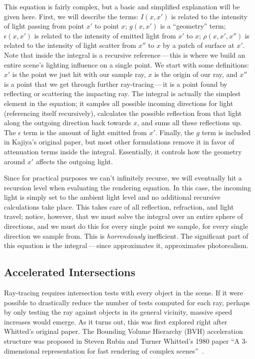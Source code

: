 This equation is fairly complex, but a basic and simplified explanation will be given here.
First, we will describe the terms: $I(x, x')$ is related to the intensity of light passing from point $x'$ to point $x$; $g(x, x')$ is a ``geometry'' term; $\epsilon(x, x')$ is related to the intensity of emitted light from $x'$ to $x$; $\rho(x, x',x'')$ is related to the intensity of light scatter from $x''$ to $x$ by a patch of surface at $x'$.
Note that inside the integral is a recursive reference\,---\,this is where we build an entire scene's lighting influence on a single point.
We start with some definitions: $x'$ is the point we just hit with our sample ray, $x$ is the origin of our ray, and $x''$ is a point that we get through further ray-tracing\,---\,it is a point found by reflecting or scattering the impacting ray.
The integral is actually the simplest element in the equation; it samples all possible incoming directions for light (referencing itself recursively), calculates the possible reflection from that light along the outgoing direction back towards $x$, and sums all these reflections up.
The $\epsilon$ term is the amount of light emitted from $x'$.
Finally, the $g$ term is included in Kajiya's original paper, but most other formulations remove it in favor of attenuation terms inside the integral.
Essentially, it controls how the geometry around $x'$ affects the outgoing light.

Since for practical purposes we can't infinitely recurse, we will eventually hit a recursion level when evaluating the rendering equation.
In this case, the incoming light is simply set to the ambient light level and no additional recursive calculations take place.
This takes care of all reflection, refraction, and light travel; notice, however, that we must solve the integral over an entire sphere of directions, and we must do this for every single point we sample, for every single direction we sample from.
This is {\it horrendously\/} inefficient.
The significant part of this equation is the integral\,---\,since \name{} approximates it, \name{} approximates photorealism.

\subsection{Accelerated Intersections}
\label{ch:relatedwork:discovery:acceleration}

Ray-tracing requires intersection tests with every object in the scene.
If it were possible to drastically reduce the number of tests computed for each ray, perhaps by only testing the ray against objects in its general vicinity, massive speed increases would emerge.
As it turns out, this was first explored right after Whitted's original paper.
The Bounding Volume Hierarchy (BVH) acceleration structure was proposed in Steven Rubin and Turner Whitted's 1980 paper ``A 3-dimensional representation for fast rendering of complex scenes''~\cite{rubin1980}.

